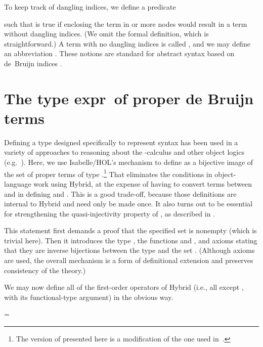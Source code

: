 \documentclass[copyright,creativecommons]{eptcs}
\begin{document}
To keep track of dangling indices, we define a predicate
  
such that  is true if enclosing the term  in
 or more  nodes would result in a term without dangling
indices.  (We omit the formal definition, which is straightforward.)
A term with no dangling indices is called , and we may
define an abbreviation
  .
These notions are standard for abstract syntax based on de~Bruijn indices
\cite{ambler/crole/momigliano:2002}.


\section{The type \ldquo expr\rdquo\ of proper de Bruijn terms}
\label{sec:hybrid-defn-expr}

Defining a type designed specifically to represent syntax has been
used in a variety of approaches to reasoning about the
-calculus and other object logics
(e.g.~\cite{Norrish:HOSC2006,Urban:JAR2008}).
Here, we use Isabelle\slash HOL's
 mechanism to define  as a bijective image of the
set of proper terms of type .\footnote{The version of
   presented here is a modification of the one used
  in~\cite{momigliano/martin/felty:2008}.}
That eliminates the 
conditions in object-language work using Hybrid, at the expense of
having to convert terms between  and  in defining
 and .  This is a good trade-off, because those
definitions are internal to Hybrid and need only be made once.  It also
turns out to be essential for strengthening the quasi-injectivity property
of , as described in .

\begin{Defn}
\label{defn:hybrid-expr-type} \formal

\end{Defn}

This  statement first demands a proof that the specified set
is nonempty (which is trivial here).  Then it introduces the type ,
the functions  and ,
and axioms stating that they are inverse bijections between the type 
and the set .
(Although axioms are used, the overall
mechanism is a form of definitional extension and preserves consistency
of the theory.)

We may now define all of the first-order operators of Hybrid (i.e., all
except , with its functional-type argument) in the obvious way.

\begin{Defn}
\label{defn:hybrid-fo-ops} \formal
{=\hbox{\qquad}
 \xdef\ajmtemp{\the\wd0}}
\makebox[\ajmtemp][l]{}\par\nopagebreak[3]
\makebox[\ajmtemp][l]{}\par\nopagebreak[3]
\makebox[\ajmtemp][l]{}\par\nopagebreak
\par\nopagebreak[3]
\makebox[\ajmtemp][l]{}
\end{Defn}
\end{document}
